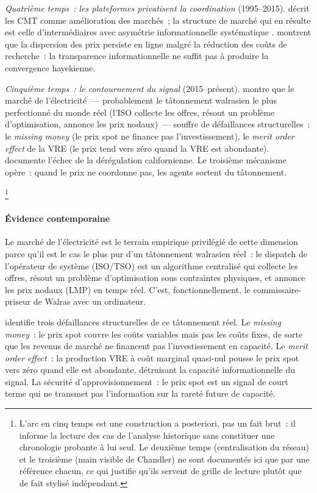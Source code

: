 \emph{Quatrième temps~: les plateformes privatisent la coordination} (1995--2015). \textcite{varian_computer_2010} décrit les CMT comme amélioration des marchés~; la structure de marché qui en résulte est celle d'intermédiaires avec asymétrie informationnelle systématique \parencite{stiglitz_contributions_2000}. \textcite{brynjolfsson_smith_2000} montrent que la dispersion des prix persiste en ligne malgré la réduction des coûts de recherche~: la transparence informationnelle ne suffit pas à produire la convergence hayekienne.

\emph{Cinquième temps~: le contournement du signal} (2015--présent). \textcite{cramton_electricity_2017} montre que le marché de l'électricité~--- probablement le tâtonnement walrasien le plus perfectionné du monde réel (l'ISO collecte les offres, résout un problème d'optimisation, annonce les prix nodaux)~--- souffre de défaillances structurelles~: le \emph{missing money} (le prix spot ne finance pas l'investissement), le \emph{merit order effect} de la VRE (le prix tend vers zéro quand la VRE est abondante). \textcite{borenstein_trouble_2002} documente l'échec de la dérégulation californienne. Le troisième mécanisme opère~: quand le prix ne coordonne pas, les agents sortent du tâtonnement.

\footnote{L'arc en cinq temps est une construction a posteriori, pas un fait brut~: il informe la lecture des cas de l'analyse historique sans constituer une chronologie probante à lui seul. Le deuxième temps (centralisation du réseau) et le troisième (main visible de Chandler) ne sont documentés ici que par une référence chacun, ce qui justifie qu'ils servent de grille de lecture plutôt que de fait stylisé indépendant.}


\paragraph{Évidence contemporaine}

Le marché de l'électricité est le terrain empirique privilégié de cette dimension parce qu'il est le cas le plus pur d'un tâtonnement walrasien réel~: le dispatch de l'opérateur de système (ISO/TSO) est un algorithme centralisé qui collecte les offres, résout un problème d'optimisation sous contraintes physiques, et annonce les prix nodaux (LMP) en temps réel. C'est, fonctionnellement, le commissaire-priseur de Walras avec un ordinateur.

\textcite{cramton_electricity_2017} identifie trois défaillances structurelles de ce tâtonnement réel. Le \emph{missing money}~: le prix spot couvre les coûts variables mais pas les coûts fixes, de sorte que les revenus de marché ne financent pas l'investissement en capacité. Le \emph{merit order effect}~: la production VRE à coût marginal quasi-nul pousse le prix spot vers zéro quand elle est abondante, détruisant la capacité informationnelle du signal. La sécurité d'approvisionnement~: le prix spot est un signal de court terme qui ne transmet pas l'information sur la rareté future de capacité.

